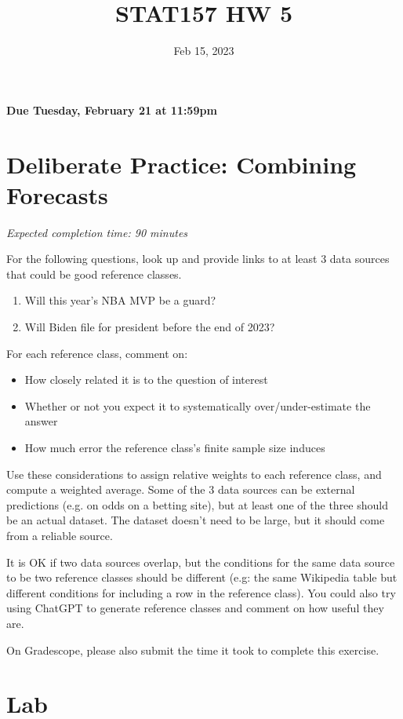 \documentclass[11pt]{article}
\title{STAT157 HW 5}
\date{Feb 15, 2023}
\begin{document}
\maketitle

\hfill \textbf{Due Tuesday, February 21 at 11:59pm}

\section*{Deliberate Practice: Combining Forecasts}

\emph{Expected completion time: 90 minutes}


For the following questions, look up and provide links to at least 3 data sources that could be good reference classes. 

\begin{enumerate}
    \item Will this year's NBA MVP be a guard?
	\item Will Biden file for president before the end of 2023?
\end{enumerate}

For each reference class, comment on: 
\begin{itemize}
	\item How closely related it is to the question of interest
	\item Whether or not you expect it to systematically over/under-estimate the answer
	\item How much error the reference class's finite sample size induces
\end{itemize}

Use these considerations to assign relative weights to each reference class, and compute a weighted average. Some of the 3 data sources can be external predictions (e.g. on odds on a betting site), but at least one of the three should be an actual dataset. The dataset doesn't need to be large, but it should come from a reliable source. 

It is OK if two data sources overlap, but the conditions for the same data source to be two reference classes should be different (e.g: the same Wikipedia table but different conditions for including a row in the reference class). You could also try using ChatGPT to generate reference classes and comment on how useful they are. 

On Gradescope, please also submit the time it took to complete this exercise.

\section*{Lab}
\end{document}
